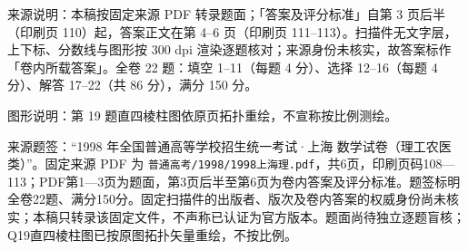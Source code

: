 

\begin{gktip}
来源说明：本稿按固定来源 PDF 转录题面；「答案及评分标准」自第 3 页后半（印刷页 110）起，答案正文在第 4–6 页（印刷页 111–113）。扫描件无文字层，上下标、分数线与图形按 300 dpi 渲染逐题核对；来源身份未核实，故答案标作「卷内所载答案」。全卷 22 题：填空 1–11（每题 4 分）、选择 12–16（每题 4 分）、解答 17–22（共 86 分），满分 150 分。

图形说明：第 19 题直四棱柱图依原页拓扑重绘，不宣称按比例测绘。
\end{gktip}

来源题签：“1998 年全国普通高等学校招生统一考试·上海 数学试卷（理工农医类）”。固定来源 PDF 为 \texttt{普通高考/1998/1998上海理.pdf}，共6页，印刷页码108—113；PDF第1—3页为题面，第3页后半至第6页为卷内答案及评分标准。题签标明全卷22题、满分150分。固定扫描件的出版者、版次及卷内答案的权威身份尚未核实；本稿只转录该固定文件，不声称已认证为官方版本。题面尚待独立逐题盲核；Q19直四棱柱图已按原图拓扑矢量重绘，不按比例。



